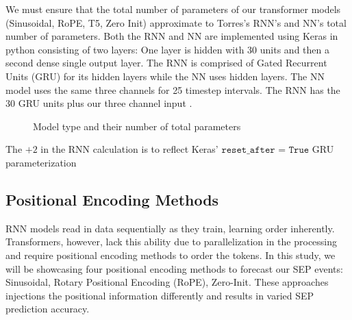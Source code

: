 


We must ensure that the total number of parameters of our transformer models (Sinusoidal,  RoPE, T5, Zero Init)  approximate to Torres's RNN's and NN's total number of parameters. Both the RNN and NN are implemented using Keras in python consisting of two layers: One layer is hidden with 30 units and then a second dense single output layer. The RNN is comprised of  Gated Recurrent Units (GRU) for its  hidden layers while the NN uses hidden layers. The NN model uses the same three channels for 25 timestep intervals. The RNN  has the 30 GRU units plus our three channel input \cite{torres2025machine}. 



\begin{figure}[!htbp]
\centering
{}
\caption{Model type and their number of total parameters}
\label{fig:param-table-template}
\end{figure}

The $+2$ in the RNN calculation is to reflect Keras' $\texttt{reset\_after = True}$ GRU parameterization

\subsection{Positional Encoding Methods}
\label{sec:positionalencodingmethods}
RNN models read in data sequentially as they train, learning order inherently. Transformers, however, lack this ability due to parallelization in the processing and require positional encoding methods to order the tokens. In this study, we will be showcasing four positional encoding methods to forecast our SEP events: Sinusoidal, Rotary Positional Encoding (RoPE), Zero-Init. These approaches injections the positional information differently and results in varied SEP prediction accuracy.

